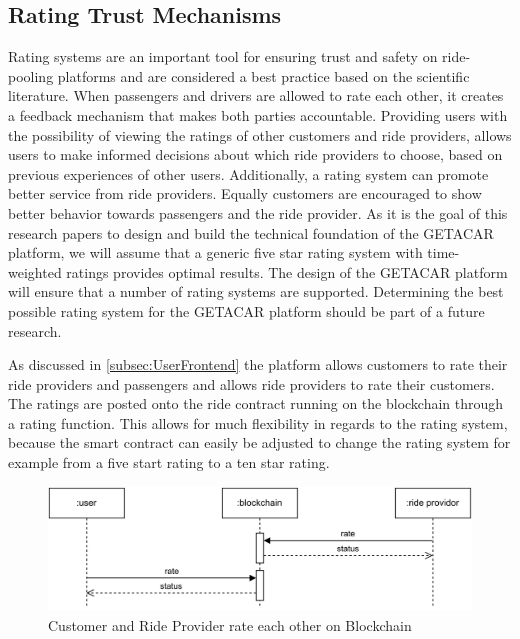 \subsection{Rating Trust Mechanisms}\label{subsec:RatingTrustMechanisms}
Rating systems are an important tool for ensuring trust and safety on ride-pooling platforms and are considered a best practice based on the scientific literature. When passengers and drivers are allowed to rate each other, it creates a feedback mechanism that makes both parties accountable. Providing users with the possibility of viewing the ratings of other customers and ride providers, allows users to make informed decisions about which ride providers to choose, based on previous experiences of other users. Additionally, a rating system can promote better service from ride providers. Equally customers are encouraged to show better behavior towards passengers and the ride provider. As it is the goal of this research papers to design and build the technical foundation of the GETACAR platform, we will assume that a generic five star rating system with time-weighted ratings provides optimal results. The design of the GETACAR platform will ensure that a number of rating systems are supported. Determining the best possible rating system for the GETACAR platform should be part of a future research. 

As discussed in \ref{subsec:UserFrontend} the platform allows customers to rate their ride providers and passengers and allows ride providers to rate their customers. The ratings are posted onto the ride contract running on the blockchain through a rating function. This allows for much flexibility in regards to the rating system, because the smart contract can easily be adjusted to change the rating system for example from a five start rating to a ten star rating. 

\begin{figure}[h]
    \centering
    \includegraphics[width=\linewidth]{data/6.svg}
    \caption{Customer and Ride Provider rate each other on Blockchain}
    \label{fig:directSVG}
\end{figure}


